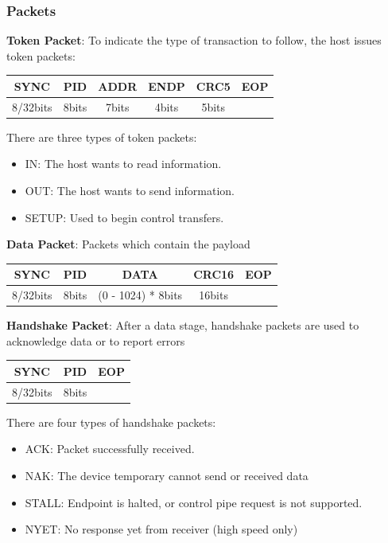 \documentclass[pdftex,10pt,a4paper]{report}
\newenvironment{packed_item}{
\begin{itemize}
  \setlength{\itemsep}{1pt}
  \setlength{\parskip}{0pt}
  \setlength{\parsep}{0pt}
}{\end{itemize}}
\begin{document}
\subsubsection{Packets}
\begin{packed_item}
	\item \textbf{Token Packet}: To indicate the type of transaction to follow, the host issues token packets:
		\begin{center}
		\begin{tabular}{|c|c|c|c|c|c|}
  	\hline
  		SYNC & PID & ADDR & ENDP & CRC5 & EOP \\ \hline
  		8/32bits & 8bits & 7bits & 4bits & 5bits &  \\
  	\hline
  	\end{tabular}
  	\end{center}
  	
  	There are three types of token packets: 
  	\begin{itemize} \itemsep 0em
			\item IN: The host wants to read information.
			\item OUT: The host wants to send information.
			\item SETUP: Used to begin control transfers.
  	\end{itemize}
  	
  	
	\item \textbf{Data Packet}: Packets which contain the payload
		\begin{center}
		\begin{tabular}{|c|c|c|c|c|}
  	\hline
  		SYNC & PID & DATA & CRC16 & EOP \\ \hline
  		8/32bits & 8bits & (0 - 1024) * 8bits & 16bits &   \\
  	\hline
  	\end{tabular}
  	\end{center}
  	
  	
	\item \textbf{Handshake Packet}: After a data stage, handshake packets are used to acknowledge data or to report errors
		\begin{center}
		\begin{tabular}{|c|c|c|}
  	\hline
  		SYNC & PID & EOP \\ \hline
  		8/32bits & 8bits &  \\
  	\hline
  	\end{tabular}
  	\end{center}
  	
  	There are four types of handshake packets:
  	\begin{itemize} \itemsep 0em
			\item ACK: Packet successfully received.
			\item NAK: The device temporary cannot send or received data
			\item STALL: Endpoint is halted, or control pipe request is not supported.
			\item NYET: No response yet from receiver (high speed only)
  	\end{itemize}
  	

\end{packed_item}
\end{document}
